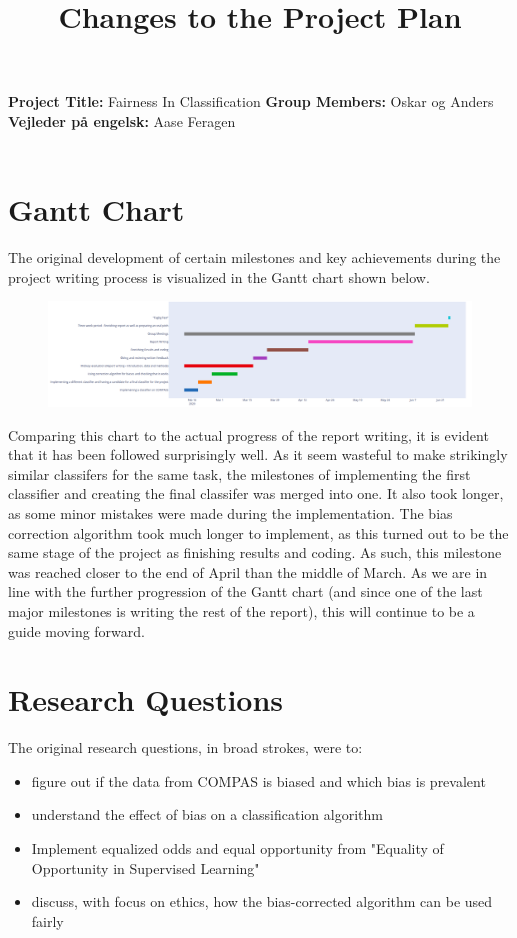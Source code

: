 \documentclass[11pt, fleqn]{article}
\title{Changes to the Project Plan}
\date{}
\begin{document}
	\maketitle
	\noindent
	\vspace*{-1.4cm}
	\noindent
	\textbf{Project Title:} Fairness In Classification \newline \noindent
	\textbf{Group Members:} Oskar og Anders \newline  \noindent
	\textbf{Vejleder på engelsk:} Aase Feragen \noindent
	\\\\
	
	\section*{Gantt Chart}
	\noindent The original development of certain milestones and key achievements during the project writing process is visualized in the Gantt chart shown below. 
	\begin{figure}[H]
		\centering
		\includegraphics[width=\linewidth]{Gantt}
	\end{figure}

	Comparing this chart to the actual progress of the report writing, it is evident that it has been followed surprisingly well. As it seem wasteful to make strikingly similar classifers for the same task, the milestones of implementing the first classifier and creating the final classifer was merged into one. It also took longer, as some minor mistakes were made during the implementation. The bias correction algorithm took much longer to implement, as this turned out to be the same stage of the project as finishing results and coding. As such, this milestone was reached closer to the end of April than the middle of March. As we are in line with the further progression of the Gantt chart (and since one of the last major milestones is writing the rest of the report), this will continue to be a guide moving forward.
	
	\section*{Research Questions}
	The original research questions, in broad strokes, were to:
	\begin{itemize}
		\itemsep-0.1cm
		\item figure out if the data from COMPAS is biased and which bias is prevalent
		\item understand the effect of bias on a classification algorithm
		\item Implement equalized odds and equal opportunity from "Equality of Opportunity in Supervised Learning"
		\item discuss, with focus on ethics, how the bias-corrected algorithm can be used fairly
	\end{itemize}
	
\end{document}
